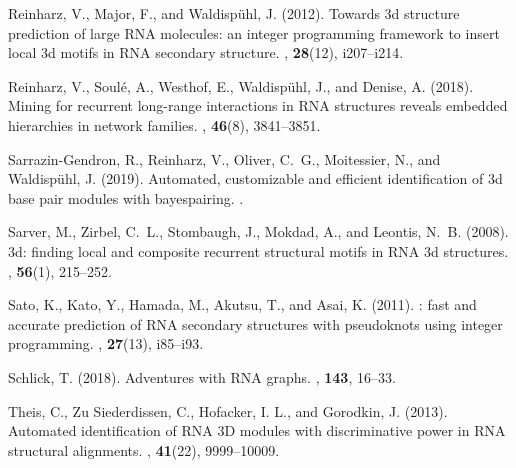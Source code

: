 \documentclass{bioinfo}
\begin{document}
\begin{thebibliography}{25}
   Reinharz, V., Major, F., and Waldisp{\"u}hl, J. (2012).
   \newblock Towards 3d structure prediction of large {RNA} molecules: an integer
     programming framework to insert local 3d motifs in {RNA} secondary structure.
   , {\bf 28}(12), i207--i214.
   
   Reinharz, V., Soul{\'e}, A., Westhof, E., Waldisp{\"u}hl, J., and Denise, A.
     (2018).
   \newblock Mining for recurrent long-range interactions in {RNA} structures
     reveals embedded hierarchies in network families.
   , {\bf 46}(8), 3841--3851.
   
   Sarrazin-Gendron, R., Reinharz, V., Oliver, C.~G., Moitessier, N., and
     Waldisp{\"u}hl, J. (2019).
   \newblock Automated, customizable and efficient identification of 3d base pair
     modules with bayespairing.
   .
   
   Sarver, M., Zirbel, C.~L., Stombaugh, J., Mokdad, A., and Leontis, N.~B.
     (2008).
   3d: finding local and composite recurrent structural motifs in
     {RNA} 3d structures.
   , {\bf 56}(1), 215--252.
   
   Sato, K., Kato, Y., Hamada, M., Akutsu, T., and Asai, K. (2011).
   : fast and accurate prediction of {RNA} secondary structures
     with pseudoknots using integer programming.
   , {\bf 27}(13), i85--i93.
   
   Schlick, T. (2018).
   \newblock Adventures with {RNA} graphs.
   , {\bf 143}, 16--33.
   
   Theis, C., Zu Siederdissen, C., Hofacker, I. L., and Gorodkin, J. (2013). 
   \newblock Automated identification of RNA 3D modules with discriminative power in RNA structural alignments. 
   , {\bf 41}(22), 9999--10009.


\end{thebibliography}
\end{document}
